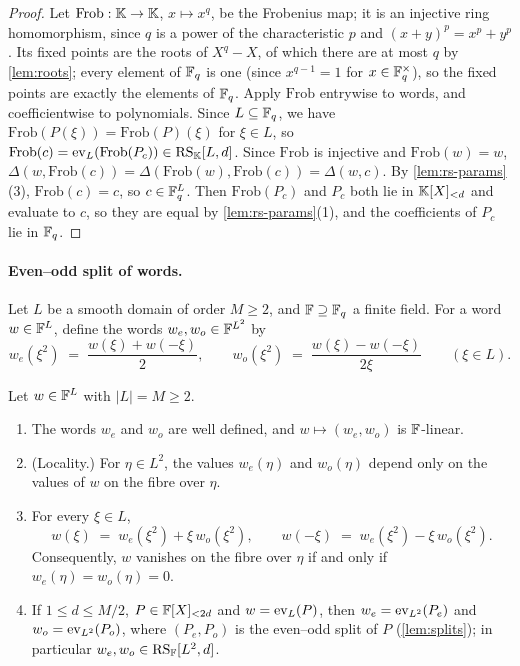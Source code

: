 \begin{proof}
Let $\mathrm{Frob} : \mathbb{K} \to \mathbb{K}$, $x \mapsto x^q$, be the Frobenius map; it is an injective ring homomorphism, since $q$ is a power of the characteristic $p$ and $(x+y)^p = x^p + y^p$.
Its fixed points are the roots of $X^q - X$, of which there are at most $q$ by \cref{lem:roots}; every element of $\mathbb{F}_q$ is one (since $x^{q-1} = 1$ for $x \in \mathbb{F}_q^\times$), so the fixed points are exactly the elements of $\mathbb{F}_q$.
Apply $\mathrm{Frob}$ entrywise to words, and coefficientwise to polynomials.
Since $L \subseteq \mathbb{F}_q$, we have $\mathrm{Frob}(P(\xi)) = \mathrm{Frob}(P)(\xi)$ for $\xi \in L$, so $\mathrm{Frob}(c) = \mathrm{ev}_L(\mathrm{Frob}(P_c)) \in \mathrm{RS}_{\mathbb{K}}[L,d]$.
Since $\mathrm{Frob}$ is injective and $\mathrm{Frob}(w) = w$, $\Delta(w, \mathrm{Frob}(c)) = \Delta(\mathrm{Frob}(w), \mathrm{Frob}(c)) = \Delta(w,c)$.
By \cref{lem:rs-params}(3), $\mathrm{Frob}(c) = c$, so $c \in \mathbb{F}_q^L$.
Then $\mathrm{Frob}(P_c)$ and $P_c$ both lie in $\mathbb{K}[X]_{<d}$ and evaluate to $c$, so they are equal by \cref{lem:rs-params}(1), and the coefficients of $P_c$ lie in $\mathbb{F}_q$.
\end{proof}

\paragraph{Even--odd split of words.}
Let $L$ be a smooth domain of order $M \ge 2$, and $\mathbb{F} \supseteq \mathbb{F}_q$ a finite field.
For a word $w \in \mathbb{F}^L$, define the words $w_e, w_o \in \mathbb{F}^{L^2}$ by
\begin{equation}\label{eq:even-odd}
  w_e(\xi^2) \;=\; \frac{w(\xi) + w(-\xi)}{2},
  \qquad
  w_o(\xi^2) \;=\; \frac{w(\xi) - w(-\xi)}{2\xi}
  \qquad (\xi \in L).
\end{equation}

\begin{lemma}\label{lem:split-words}
Let $w \in \mathbb{F}^L$ with $|L| = M \ge 2$.
\begin{enumerate}
  \item The words $w_e$ and $w_o$ are well defined, and $w \mapsto (w_e, w_o)$ is $\mathbb{F}$-linear.
  \item (Locality.) For $\eta \in L^2$, the values $w_e(\eta)$ and $w_o(\eta)$ depend only on the values of $w$ on the fibre over $\eta$.
  \item For every $\xi \in L$,
  \begin{equation}\label{eq:even-odd-inverse}
    w(\xi) \;=\; w_e(\xi^2) + \xi\, w_o(\xi^2), \qquad w(-\xi) \;=\; w_e(\xi^2) - \xi\, w_o(\xi^2).
  \end{equation}
  Consequently, $w$ vanishes on the fibre over $\eta$ if and only if $w_e(\eta) = w_o(\eta) = 0$.
  \item If $1 \le d \le M/2$, $P \in \mathbb{F}[X]_{<2d}$ and $w = \mathrm{ev}_L(P)$, then $w_e = \mathrm{ev}_{L^2}(P_e)$ and $w_o = \mathrm{ev}_{L^2}(P_o)$, where $(P_e, P_o)$ is the even--odd split of $P$ (\cref{lem:splits}); in particular $w_e, w_o \in \mathrm{RS}_{\mathbb{F}}[L^2, d]$.
\end{enumerate}
\end{lemma}


